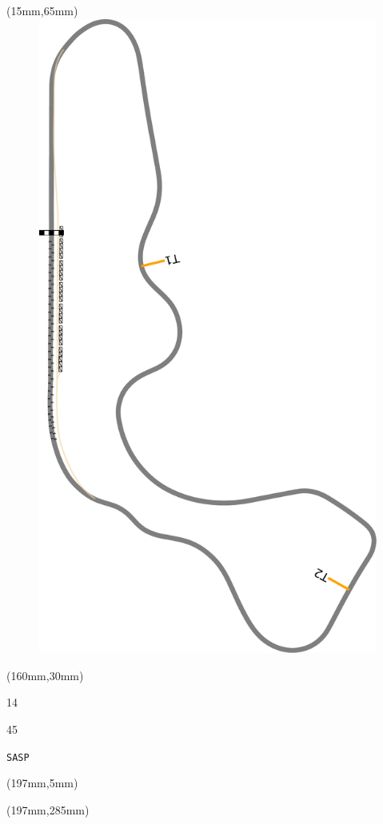 \begin{textblock*}{185mm}(15mm,65mm)%
\centering
\mbox{\includegraphics[width=185mm,height=210mm,keepaspectratio]{PT/SASP.pdf}}
\end{textblock*}
\begin{textblock*}{40mm}(160mm,30mm)%
\Large
\par{} 
\par14 
\par45 
\par\hfill\tiny\tt SASP\\
\end{textblock*}
\begin{textblock*}{20mm}(197mm,5mm)%
\fbox{\thepage}
\label{SASP}
\end{textblock*}
\begin{textblock*}{20mm}(197mm,285mm)%
\fbox{\thepage}
\end{textblock*}

